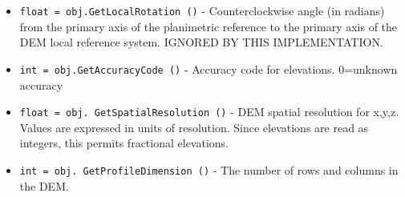 \begin{itemize}
\item  \verb|float = obj.GetLocalRotation ()| -  Counterclockwise angle (in radians) from the primary axis of the planimetric
 reference to the primary axis of the DEM local reference system.
 IGNORED BY THIS IMPLEMENTATION.

\item  \verb|int = obj.GetAccuracyCode ()| -  Accuracy code for elevations. 0=unknown accuracy

\item  \verb|float = obj. GetSpatialResolution ()| -  DEM spatial resolution for x,y,z. Values are expressed in units of resolution.
 Since elevations are read as integers, this permits fractional elevations.

\item  \verb|int = obj. GetProfileDimension ()| -  The number of rows and columns in the DEM.

\end{itemize}
